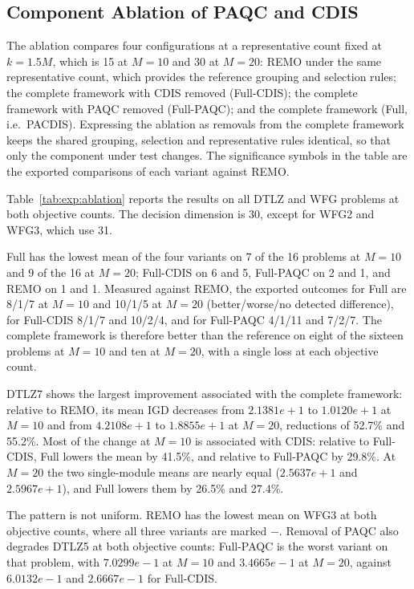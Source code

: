 \subsection{Component Ablation of PAQC and CDIS}
\label{sec:exp:ablation}

The ablation compares four configurations at a representative count fixed at
$k=1.5M$, which is 15 at $M=10$ and 30 at $M=20$: REMO under the same
representative count, which provides the reference grouping and selection
rules; the complete framework with CDIS removed (Full-CDIS); the complete
framework with PAQC removed (Full-PAQC); and the complete framework (Full,
i.e.\ PACDIS). Expressing the ablation as removals from the complete framework
keeps the shared grouping, selection and representative rules identical, so
that only the component under test changes. The significance symbols in the
table are the exported comparisons of each variant against REMO.

Table~\ref{tab:exp:ablation} reports the results on all DTLZ and WFG
problems at both objective counts. The decision dimension is 30, except for
WFG2 and WFG3, which use 31.



Full has the lowest mean of the four variants on 7 of the 16 problems at
$M=10$ and 9 of the 16 at $M=20$; Full-CDIS on 6 and 5, Full-PAQC on 2 and
1, and REMO on 1 and 1. Measured against REMO, the exported outcomes for
Full are 8/1/7 at $M=10$ and 10/1/5 at $M=20$ (better/worse/no detected
difference), for Full-CDIS 8/1/7 and 10/2/4, and for Full-PAQC 4/1/11 and
7/2/7. The complete framework is therefore better than the reference on
eight of the sixteen problems at $M=10$ and ten at $M=20$, with a single
loss at each objective count.

DTLZ7 shows the largest improvement associated with the complete framework:
relative to REMO, its mean IGD decreases from
$2.1381e+1$ to $1.0120e+1$ at $M=10$ and from $4.2108e+1$ to $1.8855e+1$ at
$M=20$, reductions of 52.7\% and 55.2\%. Most of the change at $M=10$ is
associated with CDIS: relative to Full-CDIS, Full lowers the mean by 41.5\%,
and relative to Full-PAQC by 29.8\%. At $M=20$ the two single-module means
are nearly equal ($2.5637e+1$ and $2.5967e+1$), and Full lowers them by
26.5\% and 27.4\%.

The pattern is not uniform. REMO has the lowest mean on WFG3 at both
objective counts, where all three variants are marked $-$. Removal of PAQC
also degrades DTLZ5 at both objective counts: Full-PAQC is the worst variant
on that problem, with $7.0299e-1$ at $M=10$ and $3.4665e-1$ at $M=20$,
against $6.0132e-1$ and $2.6667e-1$ for Full-CDIS.

